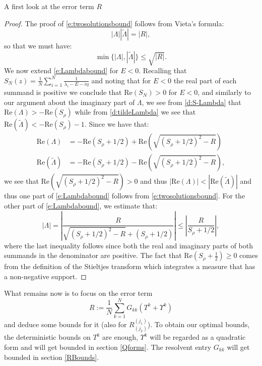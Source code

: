 \documentclass[11pt, a4paper, oneside]{book}
\numberwithin{equation}{chapter}
\begin{document}
\begin{section}{A first look at the error term \texorpdfstring{$R$}{R} }
\begin{proof}
The proof of \eqref{e:twosolutionsbound} follows from Vieta's formula:
\[
|\Lambda | | \tilde{\Lambda} | = | R |,
\]
so that we must have:
\[
\min\{|\Lambda|, |\tilde{\Lambda}|\} \leq \sqrt{|R|}.
\]
%
We now extend \eqref{e:Lambdabound} for $E<0$. Recalling that $S_N(z) = \frac{1}{N}\sum \limits_{i=1}^N \frac{1}{\lambda_i - E - i\eta}$ and noting that for $E < 0$ the real part of each summand is positive we conclude that $\mathrm{Re}( S_N ) > 0$ for $E < 0$, and similarly to our argument about the imaginary part of $\Lambda$, we see from \eqref{d:S-Lambda} that $\mathrm{Re} (\Lambda) > -\mathrm{Re} (S_{\rho})$ while from \eqref{d:tildeLambda} we see that $\mathrm{Re}( \tilde{\Lambda}) < -\mathrm{Re}(S_{\rho}) - 1$. Since we have that:
%
\begin{align*}
\mathrm{Re} (\Lambda) &= -\mathrm{Re} (S_{\rho}+1/2) + \mathrm{Re}\left (\sqrt{(S_{\rho} + 1/2)^2 - R} \right) \\
\mathrm{Re} (\tilde\Lambda) &= -\mathrm{Re} (S_{\rho}+1/2) -\mathrm{Re} \left( \sqrt{(S_{\rho} + 1/2)^2 - R} \right),
\end{align*}
%
we see that $\mathrm{Re}\left(\sqrt{(S_{\rho} + 1/2)^2 - R}\right) > 0$ and thus $|\mathrm{Re} (\Lambda) | < |\mathrm{Re} (\tilde \Lambda) |$ and thus one part of \eqref{e:Lambdabound} follows from \eqref{e:twosolutionsbound}. For the other part of \eqref{e:Lambdabound}, we estimate that:
%
\begin{equation}
|\Lambda| = \left|\frac{R}{\sqrt{(S_{\rho} + 1/2)^2 - R} + (S_{\rho} + 1/2)}\right| \leq \left|\frac{R}{S_{\rho} + 1/2}\right|,
\end{equation}
%
where the last inequality follows since both the real and imaginary parts of both summands in the denominator are positive. The fact that $\mathrm{Re} (S_{\rho}+\frac{1}{2})\geq 0$ comes from the definition of the Stieltjes transform which integrates a measure that has a non-negative support.
\end{proof}
%
What remains now is to focus on the error term
%
\begin{equation} \label{main-error}
R := \frac{1}{N} \sum_{k=1}^N G_{kk} (T^k + \Upsilon^{k})
\end{equation}
%
and deduce some bounds for it (also for $R_{(j_2)}^{(j_1)}$). To obtain our optimal bounds, the deterministic bounds on $T^k$ are enough, $\Upsilon^{k}$ will be regarded as a quadratic form and will get bounded in section \ref{Qforms}. The resolvent entry $G_{kk}$ will get bounded in section \ref{RBounds}.
%
\end{section}
\end{document}
